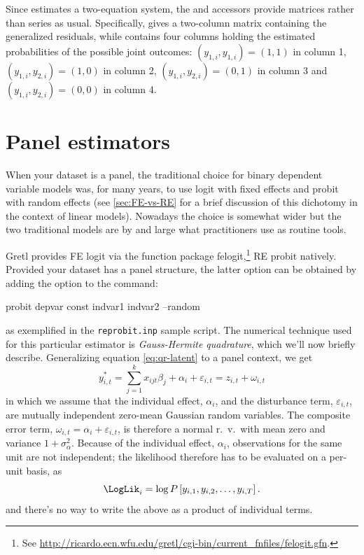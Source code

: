 Since  estimates a two-equation system, the
 and  accessors provide matrices rather than
series as usual. Specifically,  gives a two-column matrix
containing the generalized residuals, while  contains
four columns holding the estimated probabilities of the possible
joint outcomes: $(y_{1,i}, y_{1,i}) = (1,1)$ in column 1, $(y_{1,i},
y_{2,i}) = (1,0)$ in column 2, $(y_{1,i}, y_{2,i}) =
(0,1)$ in column 3 and $(y_{1,i}, y_{2,i}) = (0,0)$ in column 4.


\section{Panel estimators}
\label{sec:REprobit}

When your dataset is a panel, the traditional choice for binary
dependent variable models was, for many years, to use logit with fixed
effects and probit with random effects (see \ref{sec:FE-vs-RE} for a
brief discussion of this dichotomy in the context of linear
models). Nowadays the choice is somewhat wider but the two
traditional models are by and large what practitioners use as routine
tools.

Gretl provides FE logit via the function package
\textsf{felogit},\footnote{See
  \url{http://ricardo.ecn.wfu.edu/gretl/cgi-bin/current_fnfiles/felogit.gfn}.}
RE probit natively. Provided your dataset has a panel structure, the
latter option can be obtained by adding the  option to
the  command:
\begin{code}
  probit depvar const indvar1 indvar2 --random
\end{code}
as exemplified in the \texttt{reprobit.inp} sample script. The
numerical technique used for this particular estimator is
\emph{Gauss-Hermite quadrature}, which we'll now briefly
describe. Generalizing equation \eqref{eq:qr-latent} to a panel
context, we get
\begin{equation}
  y^*_{i,t} = \sum_{j=1}^k x_{ijt} \beta_j + \alpha_i + \varepsilon_{i,t} = z_{i,t}  +
  \omega_{i,t} 
\end{equation}
in which we assume that the individual effect, $\alpha_i$, and the
disturbance term, $\varepsilon_{i,t}$, are mutually independent
zero-mean Gaussian random variables. The composite error term,
$\omega_{i,t} = \alpha_i + \varepsilon_{i,t}$, is therefore a normal
r.~v.~with mean zero and variance $1 + \sigma^2_{\alpha}$. Because of
the individual effect, $\alpha_i$, observations for the same unit are
not independent; the likelihood therefore has to be evaluated on a
per-unit basis, as
\[
\LogLik_i = \log P\left[ y_{i,1}, y_{i,2}, \ldots , y_{i,T}\right] .
\]
and there's no way to write the above as a product of individual
terms.


